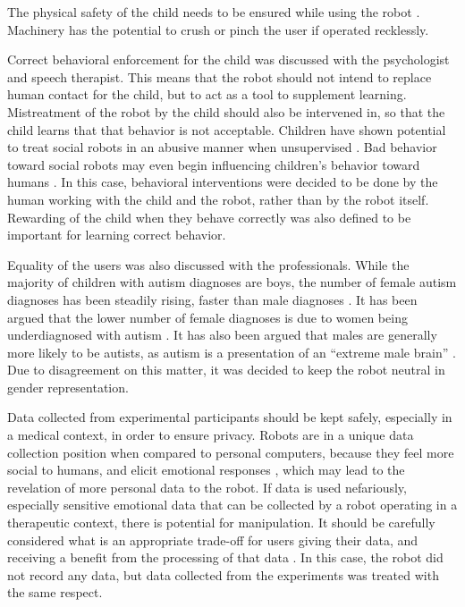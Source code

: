 The physical safety of the child needs to be ensured while using the robot \cite{giullian2010detailed}. Machinery has the potential to crush or pinch the user if operated recklessly. 

Correct behavioral enforcement for the child was discussed with the psychologist and speech therapist. This means that the robot should not intend to replace human contact for the child, but to act as a tool to supplement learning. Mistreatment of the robot by the child should also be intervened in, so that the child learns that that behavior is not acceptable. Children have shown potential to treat social robots in an abusive manner when unsupervised \cite{brscic2015escaping}. Bad behavior toward social robots may even begin influencing children's behavior toward humans \cite{walk2016}. In this case, behavioral interventions were decided to be done by the human working with the child and the robot, rather than by the robot itself. Rewarding of the child when they behave correctly was also defined to be important for learning correct behavior.

Equality of the users was also discussed with the professionals. While the majority of children with autism diagnoses are boys, the number of female autism diagnoses has been steadily rising, faster than male diagnoses \cite{jensen2014time}. It has been argued that the lower number of female diagnoses is due to women being underdiagnosed with autism \cite{krahn2012extreme}. It has also been argued that males are generally more likely to be autists, as autism is a presentation of an ``extreme male brain'' \cite{baron2002extreme}. Due to disagreement on this matter, it was decided to keep the robot neutral in gender representation.

Data collected from experimental participants should be kept safely, especially in a medical context, in order to ensure privacy. Robots are in a unique data collection position when compared to personal computers, because they feel more social to humans, and elicit emotional responses \cite{calo2014case}, which may lead to the revelation of more personal data to the robot.  If data is used nefariously, especially sensitive emotional data that can be collected by a robot operating in a therapeutic context, there is potential for manipulation. It should be carefully considered what is an appropriate trade-off for users giving their data, and receiving a benefit from the processing of that data \cite{darling2015s}. In this case, the robot did not record any data, but data collected from the experiments was treated with the same respect.



